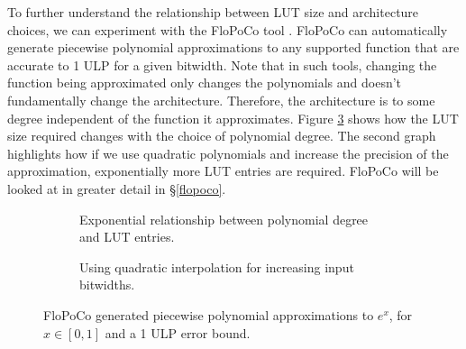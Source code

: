 \documentclass{fac}
\begin{document}
To further understand the relationship between LUT size and architecture choices, we can experiment with the FloPoCo tool \cite{DinechinPasca2011-DaT}. FloPoCo can automatically generate piecewise polynomial approximations to any supported function that are accurate to 1 ULP for a given bitwidth. Note that in such tools, changing the function being approximated only changes the polynomials and doesn't fundamentally change the architecture. Therefore, the architecture is to some degree independent of the function it approximates. Figure \ref{fig:flopo_graph} shows how the LUT size required changes with the choice of polynomial degree. The second graph highlights how if we use quadratic polynomials and increase the precision of the approximation, exponentially more LUT entries are required. FloPoCo will be looked at in greater detail in \S \ref{flopoco}.

\begin{figure}
\centering
\begin{subfigure}{.45\textwidth}
  \centering
  \caption{Exponential relationship between polynomial degree and LUT entries.}
  \label{poly_deg_vs_lut}
\end{subfigure}\hspace{1em}%
\begin{subfigure}{.45\textwidth}
  \centering
  
  \caption{Using quadratic interpolation for increasing input bitwidths.}
  \label{input_width_vs_lut}
\end{subfigure}
\caption{FloPoCo \cite{DinechinPasca2011-DaT} generated piecewise polynomial approximations to $e^{x}$, for $x \in [0,1]$ and a 1 ULP error bound.}
\label{fig:flopo_graph}
\end{figure}
\end{document}
